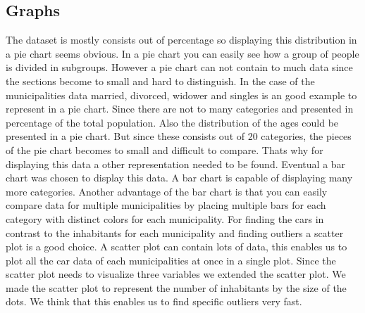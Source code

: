 \documentclass[a4paper,twoside,11pt]{article}
\begin{document}
\subsection{Graphs}
The dataset is mostly consists out of percentage so displaying this distribution in a pie chart seems obvious. In a pie chart you can easily see how a group of people is divided in subgroups. However a pie chart can not contain to much data since the sections become to small and hard to distinguish. In the case of the municipalities data married, divorced, widower and singles is an good example to represent in a pie chart. Since there are not to many categories and presented in percentage of the total population. \newline
Also the distribution of the ages could be presented in a pie chart. But since these consists out of 20 categories, the pieces of the pie chart becomes to small and difficult to compare. Thats why for displaying this data a other representation needed to be found. Eventual a bar chart was chosen to display this data. A bar chart is capable of displaying many more categories. Another advantage of the bar chart is that you can easily compare data for multiple municipalities by placing multiple bars for each category with distinct colors for each municipality. \newline
For finding the cars in contrast to the inhabitants for each municipality and finding outliers a scatter plot is a good choice. A scatter plot can contain lots of data, this enables us to plot all the car data of each municipalities at once in a single plot. Since the scatter plot needs to visualize three variables we extended the scatter plot. We made the scatter plot to represent the number of inhabitants by the size of the dots. We think that this enables us to find specific outliers very fast.
\end{document}
